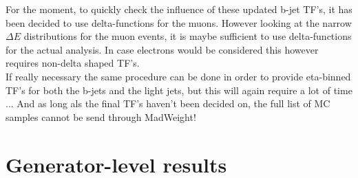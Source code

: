 For the moment, to quickly check the influence of these updated b-jet TF's, it has been decided to use delta-functions for the muons. However looking at the narrow $\Delta E$ distributions for the muon events, it is maybe sufficient to use delta-functions for the actual analysis.
In case electrons would be considered this however requires non-delta shaped TF's.\\
If really necessary the same procedure can be done in order to provide eta-binned TF's for both the b-jets and the light jets, but this will again require a lot of time ... And as long als the final TF's haven't been decided on, the full list of MC samples cannot be send through MadWeight!

\section{Generator-level results} \label{sec::GenResults}